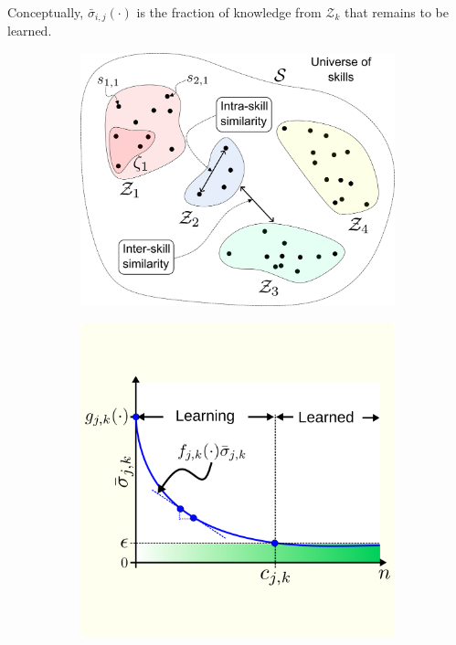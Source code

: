 \documentclass[12pt]{article}
\begin{document}
Conceptually, $\bar{\sigma}_ {i,j}\left(\cdot\right)$ is the fraction of knowledge from ${\mathcal{Z}_k}$ that remains to be learned.
\begin{figure}[!t]
	\centering
	\hspace*{\fill}
	\begin{subfigure}[t]{7.5cm}
		\subcaption{}
		\includegraphics[width=\textwidth]{skill_similarity.png} \label{fig:skill_similarity}
	\end{subfigure}
	\hfill
	\begin{subfigure}[t]{7.5cm}	
		\subcaption{}
		\includegraphics[width=\textwidth]{remaining_knowledge_dynamics_idealization.png} \label{fig:knowledge_idealization}

\end{subfigure}
\end{figure}
\end{document}
